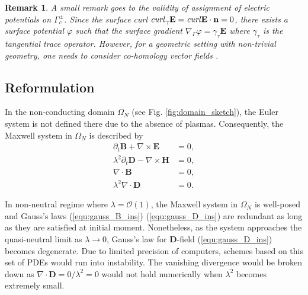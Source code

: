 \documentclass{article}
\newtheorem*{remark}{Remark}
\begin{document}
\vspace{10pt}

\begin{remark}
    A small remark goes to the validity of assignment of electric potentials on $\Gamma_c^\pm$. Since the surface curl $\text{\emph{curl}}_\gamma\mathbf{E} = \text{\emph{curl}} \mathbf{E} \cdot \mathbf{n} = 0$, there exists a surface potential $\varphi$ such that the surface gradient $\nabla_\Gamma \varphi = \gamma_\tau \mathbf{E}$ where $\gamma_\tau $ is the tangential trace operator. However, for a geometric setting with non-trivial geometry, one needs to consider co-homology vector fields \cite{Hiptmair_2021}.
\end{remark}



\subsection{Reformulation} \label{sec:reform_continuous}
In the non-conducting domain $\Omega_N$ (see Fig. \ref{fig:domain_sketch}), the Euler system is not defined there due to the absence of plasmas. Consequently, the Maxwell system in $\Omega_N$ is described by
\begin{subequations}
\begin{align}
    \partial_t \mathbf{B} + \nabla \times \mathbf{E} &= 0, \label{equ:faraday_ins}\\ 
    \lambda^2 \partial_t \mathbf{D} - \nabla \times \mathbf{H} &= 0,  \label{equ:ampere_ins}\\
    \nabla \cdot \mathbf{B} &= 0, \label{equ:gauss_B_ins}\\
    \lambda^2 \nabla \cdot \mathbf{D} &= 0 \label{equ:gauss_D_ins}.
\end{align}
\end{subequations}

In non-neutral regime where $\lambda = \mathcal{O}(1)$, the Maxwell system in $\Omega_N$ is well-posed and Gauss's laws (\ref{equ:gauss_B_ins}) (\ref{equ:gauss_D_ins}) are redundant as long as they are satisfied at initial moment. Nonetheless, as the system approaches the quasi-neutral limit as $\lambda \rightarrow 0$, Gauss's law for $\mathbf{D}$-field (\ref{equ:gauss_D_ins}) becomes degenerate. Due to limited precision of computers, schemes based on this set of PDEs would run into instability. The vanishing divergence would be broken down as $\nabla \cdot \mathbf{D} = 0/\lambda^2 = 0$ would not hold numerically when $\lambda^2$ becomes extremely small. 
\end{document}
